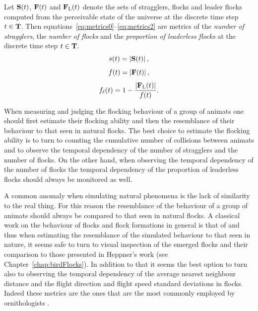 \begin{defn}
\label{def:metrics}
Let ${\mathbf{S}}(t)$, ${\mathbf{F}}(t)$ and ${\mathbf{F}}_\mathrm{L}(t)$ denote the sets of stragglers, flocks and leader flocks computed from the perceivable state of the universe at the discrete time step $t \in {\ensuremath{\mathbf{T}}}$. Then equations~\eqref{eq:metrics0}--\eqref{eq:metrics2} are metrics of the \emph{number of stragglers}, the \emph{number of flocks} and the \emph{proportion of leaderless flocks} at the discrete time step $t \in {\ensuremath{\mathbf{T}}}$.
\begin{equation}
s(t)=\left|{\mathbf{S}}(t)\right|, \label{eq:metrics0}
\end{equation}
\vspace*{-6mm}
\begin{equation}
f(t)=\left|{\mathbf{F}}(t)\right|,
\end{equation}
\vspace*{-2mm}
\begin{equation}
f_\ell(t)=1-\frac{\left|{\mathbf{F}}_\mathrm{L}(t)\right|}{f(t)}. \label{eq:metrics2}
\end{equation}
\end{defn}

When measuring and judging the flocking behaviour of a group of animats one should first estimate their flocking ability and then the resemblance of their behaviour to that seen in natural flocks. The best choice to estimate the flocking ability is to turn to counting the cumulative number of collisions between animats and to observe the temporal dependency of the number of stragglers and the number of flocks.  On the other hand, when observing the temporal dependency of the number of flocks the temporal dependency of the proportion of leaderless flocks should always be monitored as well.

A common anomaly when simulating natural phenomena is the lack of similarity to the real thing. For this reason the resemblance of the behaviour of a group of animats should always be compared to that seen in natural flocks. A classical work on the behaviour of flocks and flock formations in general is that of  and thus when estimating the resemblance of the simulated behaviour to that seen in nature, it seems safe to turn to visual inspection of the emerged flocks and their comparison to those presented in Heppner's work (see Chapter~\ref{chap:birdFlocks}). In addition to that it seems the best option to turn also to observing the temporal dependency of the average nearest neighbour distance and the flight direction and flight speed standard deviations in flocks. Indeed these metrics are the ones that are the most commonly employed by ornithologists \cite{gould:1974,heppner:1985,pomeroy:1992}.

